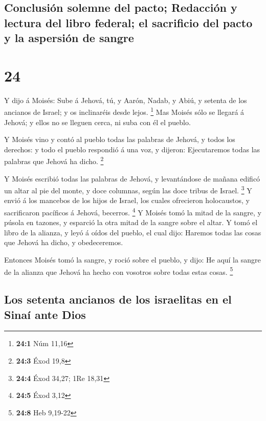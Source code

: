 \hypertarget{conclusiuxf3n-solemne-del-pacto-redacciuxf3n-y-lectura-del-libro-federal-el-sacrificio-del-pacto-y-la-aspersiuxf3n-de-sangre}{%
\subsection{Conclusión solemne del pacto; Redacción y lectura del libro
federal; el sacrificio del pacto y la aspersión de
sangre}\label{conclusiuxf3n-solemne-del-pacto-redacciuxf3n-y-lectura-del-libro-federal-el-sacrificio-del-pacto-y-la-aspersiuxf3n-de-sangre}}

\hypertarget{section-23}{%
\section{24}\label{section-23}}

 Y dijo á Moisés: Sube á Jehová, tú, y Aarón, Nadab, y Abiú,
y setenta de los ancianos de Israel; y os inclinaréis desde lejos.
\footnote{\textbf{24:1} Núm 11,16}  Mas Moisés sólo se
llegará á Jehová; y ellos no se lleguen cerca, ni suba con él el pueblo.

 Y Moisés vino y contó al pueblo todas las palabras de
Jehová, y todos los derechos: y todo el pueblo respondió á una voz, y
dijeron: Ejecutaremos todas las palabras que Jehová ha dicho.
\footnote{\textbf{24:3} Éxod 19,8}

 Y Moisés escribió todas las palabras de Jehová, y
levantándose de mañana edificó un altar al pie del monte, y doce
columnas, según las doce tribus de Israel. \footnote{\textbf{24:4} Éxod
  34,27; 1Re 18,31}  Y envió á los mancebos de los hijos de
Israel, los cuales ofrecieron holocaustos, y sacrificaron pacíficos á
Jehová, becerros. \footnote{\textbf{24:5} Éxod 3,12}  Y
Moisés tomó la mitad de la sangre, y púsola en tazones, y esparció la
otra mitad de la sangre sobre el altar.  Y tomó el libro de
la alianza, y leyó á oídos del pueblo, el cual dijo: Haremos todas las
cosas que Jehová ha dicho, y obedeceremos.

 Entonces Moisés tomó la sangre, y roció sobre el pueblo, y
dijo: He aquí la sangre de la alianza que Jehová ha hecho con vosotros
sobre todas estas cosas. \footnote{\textbf{24:8} Heb 9,19-22}

\hypertarget{los-setenta-ancianos-de-los-israelitas-en-el-sinauxed-ante-dios}{%
\subsection{Los setenta ancianos de los israelitas en el Sinaí ante
Dios}\label{los-setenta-ancianos-de-los-israelitas-en-el-sinauxed-ante-dios}}

